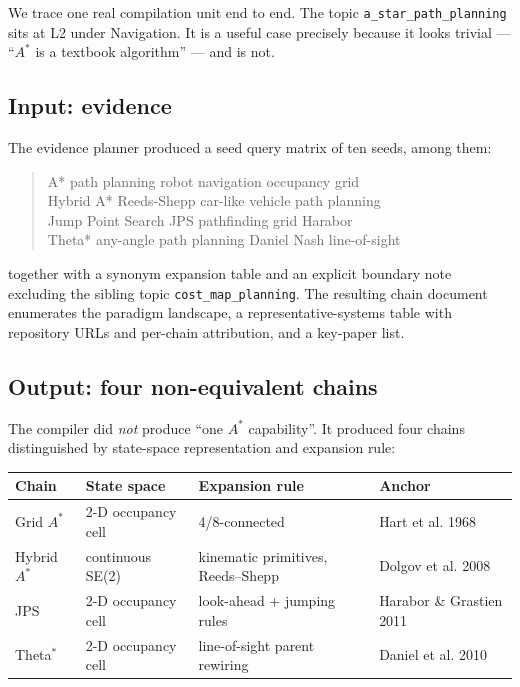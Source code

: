\documentclass[10pt,a4paper]{article}
\begin{document}
We trace one real compilation unit end to end. The topic
\texttt{a\_star\_path\_planning} sits at L2 under Navigation. It is a useful case
precisely because it looks trivial --- ``$A^\ast$ is a textbook algorithm'' ---
and is not.

\subsection{Input: evidence}

The evidence planner produced a seed query matrix of ten seeds, among them:

\begin{quote}\ttfamily\small
A* path planning robot navigation occupancy grid\\
Hybrid A* Reeds-Shepp car-like vehicle path planning\\
Jump Point Search JPS pathfinding grid Harabor\\
Theta* any-angle path planning Daniel Nash line-of-sight
\end{quote}

\noindent together with a synonym expansion table and an explicit boundary note
excluding the sibling topic
\texttt{cost\_map\_planning}. The resulting chain document enumerates the
paradigm landscape, a representative-systems table with repository URLs and
per-chain attribution, and a key-paper list.

\subsection{Output: four non-equivalent chains}

The compiler did \emph{not} produce ``one $A^\ast$ capability''. It produced four
chains distinguished by state-space representation and expansion rule:

\begin{center}
\small
\begin{tabular}{@{}llll@{}}
\toprule
Chain & State space & Expansion rule & Anchor \\
\midrule
Grid $A^\ast$   & 2-D occupancy cell & 4/8-connected & Hart et al. 1968~\cite{hart1968astar} \\
Hybrid $A^\ast$ & continuous SE(2)   & kinematic primitives, Reeds--Shepp & Dolgov et al. 2008~\cite{dolgov2008hybrid} \\
JPS             & 2-D occupancy cell & look-ahead + jumping rules & Harabor \& Grastien 2011~\cite{harabor2011jps} \\
Theta$^\ast$    & 2-D occupancy cell & line-of-sight parent rewiring & Daniel et al. 2010~\cite{daniel2010theta} \\
\bottomrule
\end{tabular}
\end{center}
\end{document}
